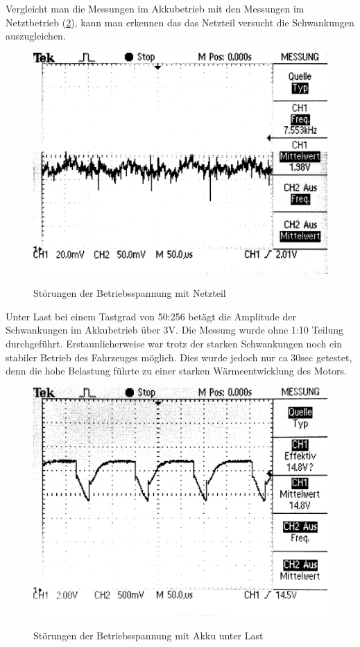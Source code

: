 Vergleicht man die Messungen im Akkubetrieb mit den Messungen im Netztbetrieb (\cref{fig:power_supply}), kann man erkennen das das Netzteil versucht die Schwankungen auszugleichen.

\begin{figure}[H]
\centering
\includegraphics[width=.8\textwidth]{VCC_SUPPLY.png}\\
\caption{Störungen der Betriebsspannung mit Netzteil}%
\label{fig:power_supply}
\end{figure}

Unter Last bei einem Tastgrad von 50:256 betägt die Amplitude der Schwankungen im Akkubetrieb über 3V. Die Messung wurde ohne 1:10 Teilung durchgeführt.
Erstaunlicherweise war trotz der starken Schwankungen noch ein stabiler Betrieb des Fahrzeuges möglich. Dies wurde jedoch nur ca 30sec getestet, denn
die hohe Belastung führte zu einer starken Wärmeentwicklung des Motors.

\begin{figure}[H]
\centering
\includegraphics[width=.8\textwidth]{VCC_AKKU_LAST.png}\\
\caption{Störungen der Betriebsspannung mit Akku unter Last}%
\label{fig:power_supply}
\end{figure}

